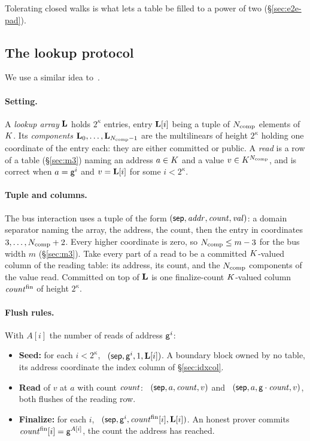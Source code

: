 \begin{remark}
  Tolerating closed walks is what lets a table be filled to a power of two (\S\ref{sec:e2e-pad}).
\end{remark}

\subsection{The lookup protocol}\label{sec:lookup}

We use a similar idea to~\cite[Protocol.~4.27]{DP23}.

\paragraph{Setting.} A \emph{lookup array} $\mathbf{L}$ holds $2^{\kappa}$ entries, entry $\mathbf{L}[i]$ being a tuple of $N_{\mathrm{comp}}$ elements of $K$. Its \emph{components} $\mathbf{L}_0,\dots,\mathbf{L}_{N_{\mathrm{comp}}-1}$ are the multilinears of height $2^{\kappa}$ holding one coordinate of the entry each: they are either committed or public. A \emph{read} is a row of a table (\S\ref{sec:m3}) naming an address $a\in K$ and a value $v\in K^{N_{\mathrm{comp}}}$, and is correct when $a=\mathsf{g}^{i}$ and $v=\mathbf{L}[i]$ for some $i<2^{\kappa}$.

\paragraph{Tuple and columns.} The bus interaction uses a tuple of the form $( \mathsf{sep},\mathit{addr},\mathit{count},\mathit{val} )$: a domain separator naming the array, the address, the count, then the entry in coordinates $3,\dots,N_{\mathrm{comp}}+2$. Every higher coordinate is zero, so $N_{\mathrm{comp}}\le m-3$ for the bus width $m$ (\S\ref{sec:m3}). Take every part of a read to be a committed $K$-valued column of the reading table: its address, its count, and the $N_{\mathrm{comp}}$ components of the value read. Committed on top of $\mathbf{L}$ is one finalize-count $K$-valued column $\mathit{count}^{\mathrm{fin}}$ of height $2^{\kappa}$.

\paragraph{Flush rules.} With $A[i]$ the number of reads of address $\mathsf{g}^{i}$:
\begin{itemize}
\item \textbf{Seed:} for each $i<2^{\kappa}$, \push\ $( \mathsf{sep},\mathsf{g}^{i},1,\mathbf{L}[i] )$. A boundary block owned by no table, its address coordinate the index column of \S\ref{sec:idxcol}.
\item \textbf{Read} of $v$ at $a$ with count $\mathit{count}$: \pull\ $( \mathsf{sep},a,\mathit{count},v )$ and \push\ $( \mathsf{sep},a,\mathsf{g}\cdot\mathit{count},v )$, both flushes of the reading row.
\item \textbf{Finalize:} for each $i$, \pull\ $( \mathsf{sep},\mathsf{g}^{i},\mathit{count}^{\mathrm{fin}}[i],\mathbf{L}[i] )$. An honest prover commits $\mathit{count}^{\mathrm{fin}}[i]=\mathsf{g}^{A[i]}$, the count the address has reached.
\end{itemize}

